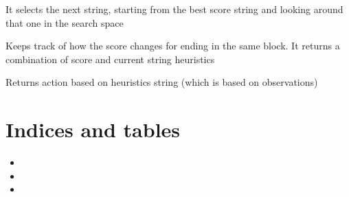\documentclass[letterpaper,10pt,english]{sphinxmanual}
\begin{document}
\begin{fulllineitems}
\begin{fulllineitems}
\end{fulllineitems}


\begin{fulllineitems}
\label{\detokenize{index:algorithms.hillclimbing.climber.pick_next_string}}
It selects the next string, starting from the best score string and looking around that one in the search space

\end{fulllineitems}


\begin{fulllineitems}
\label{\detokenize{index:algorithms.hillclimbing.climber.process_score}}
Keeps track of how the score changes for ending in the same block. It returns a combination of score and
current string heuristics

\end{fulllineitems}


\begin{fulllineitems}
\label{\detokenize{index:algorithms.hillclimbing.climber.get_action}}
Returns action based on heuristics string (which is based on observations)

\end{fulllineitems}


\end{fulllineitems}



\chapter{Indices and tables}
\label{\detokenize{index:indices-and-tables}}\begin{itemize}
\item {} 

\item {} 

\item {} 

\end{itemize}
\end{document}
